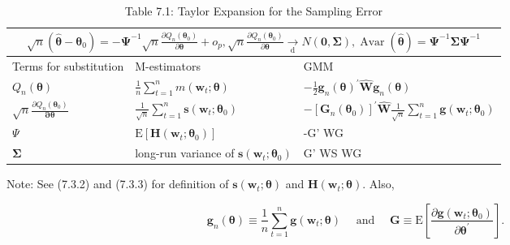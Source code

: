 \documentclass[10pt]{article}
\begin{document}
\begin{table}[h]
\begin{center}
\captionsetup{labelformat=empty}
\caption{Table 7.1: Taylor Expansion for the Sampling Error}
\begin{tabular}{|l|l|l|}
\hline
\multicolumn{3}{|c|}{$\sqrt{n}\left(\hat{\boldsymbol{\theta}}-\boldsymbol{\theta}_{0}\right)=-\boldsymbol{\Psi}^{-1} \sqrt{n} \frac{\partial Q_{n}\left(\boldsymbol{\theta}_{0}\right)}{\partial \boldsymbol{\theta}}+o_{p}, \sqrt{n} \frac{\partial Q_{n}\left(\boldsymbol{\theta}_{0}\right)}{\partial \boldsymbol{\theta}} \underset{\mathrm{d}}{\rightarrow} N(\mathbf{0}, \boldsymbol{\Sigma}), \operatorname{Avar}(\hat{\boldsymbol{\theta}})=\boldsymbol{\Psi}^{-1} \boldsymbol{\Sigma} \boldsymbol{\Psi}^{-1}$} \\
\hline
Terms for substitution & M-estimators & GMM \\
\hline
$Q_{n}(\boldsymbol{\theta})$ & $\frac{1}{n} \sum_{t=1}^{n} m\left(\mathbf{w}_{t} ; \boldsymbol{\theta}\right)$ & $-\frac{1}{2} \mathbf{g}_{n}(\boldsymbol{\theta})^{\prime} \widehat{\mathbf{W}} \mathbf{g}_{n}(\boldsymbol{\theta})$ \\
\hline
$\sqrt{n} \frac{\partial Q_{n}\left(\boldsymbol{\theta}_{0}\right)}{\boldsymbol{\partial} \boldsymbol{\theta}}$ & $\frac{1}{\sqrt{n}} \sum_{t=1}^{n} \mathbf{s}\left(\mathbf{w}_{t} ; \boldsymbol{\theta}_{0}\right)$ & $-\left[\mathbf{G}_{n}\left(\boldsymbol{\theta}_{0}\right)\right]^{\prime} \widehat{\mathbf{W}} \frac{1}{\sqrt{n}} \sum_{t=1}^{n} \mathbf{g}\left(\mathbf{w}_{t} ; \boldsymbol{\theta}_{0}\right)$ \\
\hline
$\Psi$ & $\mathrm{E}\left[\mathbf{H}\left(\mathbf{w}_{t} ; \boldsymbol{\theta}_{0}\right)\right]$ & -G' WG \\
\hline
$\boldsymbol{\Sigma}$ & long-run variance of $\mathbf{s}\left(\mathbf{w}_{t} ; \boldsymbol{\theta}_{0}\right)$ & G' WS WG \\
\hline
\end{tabular}
\end{center}
\end{table}

Note: See (7.3.2) and (7.3.3) for definition of $\mathbf{s}\left(\mathbf{w}_{t} ; \boldsymbol{\theta}\right)$ and $\mathbf{H}\left(\mathbf{w}_{t} ; \boldsymbol{\theta}\right)$. Also,

$$
\mathbf{g}_{n}(\boldsymbol{\theta}) \equiv \frac{1}{n} \sum_{t=1}^{n} \mathbf{g}\left(\mathbf{w}_{t} ; \boldsymbol{\theta}\right) \quad \text { and } \quad \mathbf{G} \equiv \mathrm{E}\left[\frac{\partial \mathbf{g}\left(\mathbf{w}_{t} ; \boldsymbol{\theta}_{0}\right)}{\partial \boldsymbol{\theta}^{\prime}}\right] .
$$
\end{document}
